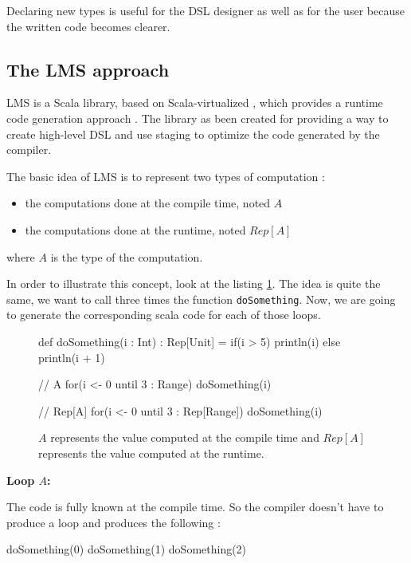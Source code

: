 
Declaring new types is useful for the \gls{DSL} designer as well as for the user
because the written code becomes clearer.

\subsection{The LMS approach}
\label{subsec:lms_approach}

\gls{LMS} is a Scala library, based on Scala-virtualized \cite{Rompf2012}, which
provides a runtime code generation approach
\cite{Rompf:2010:LMS:1942788.1868314}. The library as been created for providing
a way to create high-level \gls{DSL} and use staging to optimize the code
generated by the compiler.

The basic idea of \gls{LMS} is to represent two types of computation :
\begin{itemize}
\item the computations done at the compile time, noted $A$
\item the computations done at the runtime, noted $Rep[A]$
\end{itemize}

where $A$ is the type of the computation.

In order to illustrate this concept, look at the listing \ref{lst:lms-example}.
The idea is quite the same, we want to call three times the function
{\normalsize \verb|doSomething|}. Now, we are going to generate the
corresponding scala code for each of those loops.

\begin{figure}[ht]
  \centering
\begin{scalacode}
def doSomething(i : Int) : Rep[Unit] = {
  if(i > 5)
    println(i)
  else
    println(i + 1)
}

// A
for(i <- 0 until 3 : Range) {
  doSomething(i)
}

// Rep[A]
for(i <- 0 until 3 : Rep[Range]) {
  doSomething(i)
}
\end{scalacode}
  \caption[Difference between \(A\) and \(Rep\lbrack A\rbrack\) in a code example]{$A$ represents
    the value computed at the compile time and $Rep[A]$ represents the value
    computed at the runtime.}
  \label{lst:lms-example}
\end{figure}

\textbf{Loop $A$:}

The code  is fully known at the compile time. So
the compiler doesn't have to produce a loop and produces the following :
\begin{scalacode}
doSomething(0)
doSomething(1)
doSomething(2)
\end{scalacode}

